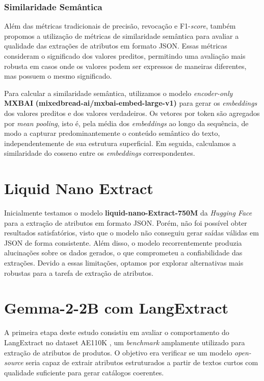 \subsubsection{Similaridade Semântica}

Além das métricas tradicionais de precisão, revocação e F1-\textit{score}, também propomos a utilização de métricas de similaridade semântica para avaliar a qualidade das extrações de atributos em formato JSON. Essas métricas consideram o significado dos valores preditos, permitindo uma avaliação mais robusta em casos onde os valores podem ser expressos de maneiras diferentes, mas possuem o mesmo significado.

Para calcular a similaridade semântica, utilizamos o modelo \textit{encoder-only} \textbf{MXBAI} \textbf{(mixedbread-ai/mxbai-embed-large-v1)} para gerar os \textit{embeddings} dos valores preditos e dos valores verdadeiros. Os vetores por token são agregados por \textit{mean pooling}, isto é, pela média dos \textit{embeddings} ao longo da sequência, de modo a capturar predominantemente o conteúdo semântico do texto, independentemente de sua estrutura superficial. Em seguida, calculamos a similaridade do cosseno entre os \textit{embeddings} correspondentes.

\section{Liquid Nano Extract}

Inicialmente testamos o modelo \textbf{liquid-nano-Extract-750M} da \textit{Hugging Face} para a extração de atributos em formato JSON. Porém, não foi possível obter resultados satisfatórios, visto que o modelo não conseguiu gerar saídas válidas em JSON de forma consistente. Além disso, o modelo recorrentemente produzia alucinações sobre os dados gerados, o que comprometeu a confiabilidade das extrações. Devido a essas limitações, optamos por explorar alternativas mais robustas para a tarefa de extração de atributos.

\section{Gemma-2-2B com LangExtract}

A primeira etapa deste estudo consistiu em avaliar o comportamento do LangExtract no dataset AE110K \citet{ExtractGPT2023}, um \textit{benchmark} amplamente utilizado para extração de atributos de produtos. O objetivo era verificar se um modelo \textit{open-source} seria capaz de extrair atributos estruturados a partir de textos curtos com qualidade suficiente para gerar catálogos coerentes.

